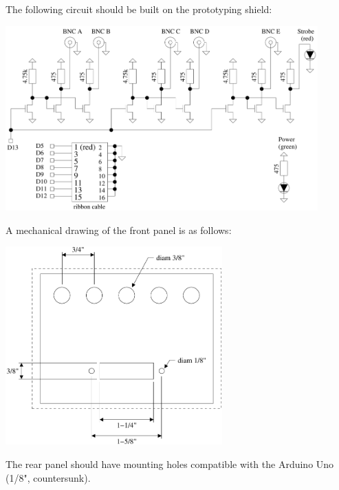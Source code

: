 \clearpage
The following circuit should be built on the prototyping shield:

\begin{center}
\includegraphics[width=0.9\textwidth]{schematics/gpio-dev-schem.pdf}
\end{center}

A mechanical drawing of the front panel is as follows:

\begin{center}
\includegraphics[height=3in]{drawings/gpio-dev-front-mech.pdf}
\end{center}

The rear panel should have mounting holes compatible with the Arduino Uno
(1/8", countersunk).

%

